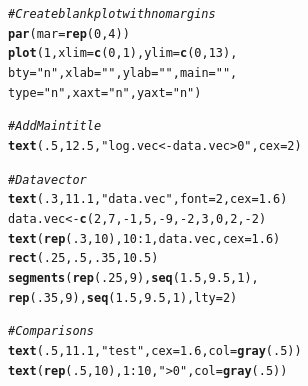 \documentclass{tufte-book}\usepackage[]{graphicx}\usepackage[]{color}
\makeatletter
\newcommand{\hlnum}[1]{\textcolor[rgb]{0.686,0.059,0.569}{#1}}%
\newcommand{\hlstr}[1]{\textcolor[rgb]{0.192,0.494,0.8}{#1}}%
\newcommand{\hlcom}[1]{\textcolor[rgb]{0.678,0.584,0.686}{\textit{#1}}}%
\newcommand{\hlopt}[1]{\textcolor[rgb]{0,0,0}{#1}}%
\newcommand{\hlstd}[1]{\textcolor[rgb]{0.345,0.345,0.345}{#1}}%
\newcommand{\hlkwb}[1]{\textcolor[rgb]{0.69,0.353,0.396}{#1}}%
\newcommand{\hlkwc}[1]{\textcolor[rgb]{0.333,0.667,0.333}{#1}}%
\newcommand{\hlkwd}[1]{\textcolor[rgb]{0.737,0.353,0.396}{\textbf{#1}}}%
\newenvironment{kframe}{%
 \def\at@end@of@kframe{}%
 \ifinner\ifhmode%
  \def\at@end@of@kframe{\end{minipage}}%
  \begin{minipage}{\columnwidth}%
 \fi\fi%
 \def\FrameCommand##1{\hskip\@totalleftmargin \hskip-\fboxsep
 \colorbox{shadecolor}{##1}\hskip-\fboxsep
     \hskip-\linewidth \hskip-\@totalleftmargin \hskip\columnwidth}%
 \MakeFramed {\advance\hsize-\width
   \@totalleftmargin\z@ \linewidth\hsize
   \@setminipage}}%
 {\par\unskip\endMakeFramed%
 \at@end@of@kframe}
\newenvironment{knitrout}{}{} %
\makeatother
\begin{document}
\begin{marginfigure}
\begin{tiny}
\begin{knitrout}
\color{fgcolor}\begin{kframe}
\begin{alltt}
\hlcom{# Create blank plot with no margins}
\hlkwd{par}\hlstd{(}\hlkwc{mar} \hlstd{=} \hlkwd{rep}\hlstd{(}\hlnum{0}\hlstd{,} \hlnum{4}\hlstd{))}
\hlkwd{plot}\hlstd{(}\hlnum{1}\hlstd{,} \hlkwc{xlim} \hlstd{=} \hlkwd{c}\hlstd{(}\hlnum{0}\hlstd{,} \hlnum{1}\hlstd{),} \hlkwc{ylim} \hlstd{=} \hlkwd{c}\hlstd{(}\hlnum{0}\hlstd{,} \hlnum{13}\hlstd{),}
     \hlkwc{bty} \hlstd{=} \hlstr{"n"}\hlstd{,} \hlkwc{xlab} \hlstd{=} \hlstr{""}\hlstd{,} \hlkwc{ylab} \hlstd{=} \hlstr{""}\hlstd{,} \hlkwc{main} \hlstd{=} \hlstr{""}\hlstd{,}
     \hlkwc{type} \hlstd{=} \hlstr{"n"}\hlstd{,} \hlkwc{xaxt} \hlstd{=} \hlstr{"n"}\hlstd{,} \hlkwc{yaxt} \hlstd{=} \hlstr{"n"}\hlstd{)}

\hlcom{# Add Main title}
\hlkwd{text}\hlstd{(}\hlnum{.5}\hlstd{,} \hlnum{12.5}\hlstd{,} \hlstr{"log.vec <- data.vec > 0"}\hlstd{,} \hlkwc{cex} \hlstd{=} \hlnum{2}\hlstd{)}

\hlcom{# Data vector}
\hlkwd{text}\hlstd{(}\hlnum{.3}\hlstd{,} \hlnum{11.1}\hlstd{,} \hlstr{"data.vec"}\hlstd{,} \hlkwc{font} \hlstd{=} \hlnum{2}\hlstd{,} \hlkwc{cex} \hlstd{=} \hlnum{1.6}\hlstd{)}
\hlstd{data.vec} \hlkwb{<-} \hlkwd{c}\hlstd{(}\hlnum{2}\hlstd{,} \hlnum{7}\hlstd{,} \hlopt{-}\hlnum{1}\hlstd{,} \hlnum{5}\hlstd{,} \hlopt{-}\hlnum{9}\hlstd{,} \hlopt{-}\hlnum{2}\hlstd{,} \hlnum{3}\hlstd{,} \hlnum{0}\hlstd{,} \hlnum{2}\hlstd{,} \hlopt{-}\hlnum{2}\hlstd{)}
\hlkwd{text}\hlstd{(}\hlkwd{rep}\hlstd{(}\hlnum{.3}\hlstd{,} \hlnum{10}\hlstd{),} \hlnum{10}\hlopt{:}\hlnum{1}\hlstd{, data.vec,} \hlkwc{cex} \hlstd{=} \hlnum{1.6}\hlstd{)}
\hlkwd{rect}\hlstd{(}\hlnum{.25}\hlstd{,} \hlnum{.5}\hlstd{,} \hlnum{.35}\hlstd{,} \hlnum{10.5}\hlstd{)}
\hlkwd{segments}\hlstd{(}\hlkwd{rep}\hlstd{(}\hlnum{.25}\hlstd{,} \hlnum{9}\hlstd{),} \hlkwd{seq}\hlstd{(}\hlnum{1.5}\hlstd{,} \hlnum{9.5}\hlstd{,} \hlnum{1}\hlstd{),}
         \hlkwd{rep}\hlstd{(}\hlnum{.35}\hlstd{,} \hlnum{9}\hlstd{),} \hlkwd{seq}\hlstd{(}\hlnum{1.5}\hlstd{,} \hlnum{9.5}\hlstd{,} \hlnum{1}\hlstd{),} \hlkwc{lty} \hlstd{=} \hlnum{2}\hlstd{)}


\hlcom{# Comparisons}
\hlkwd{text}\hlstd{(}\hlnum{.5}\hlstd{,} \hlnum{11.1}\hlstd{,} \hlstr{"test"}\hlstd{,} \hlkwc{cex} \hlstd{=} \hlnum{1.6}\hlstd{,} \hlkwc{col} \hlstd{=} \hlkwd{gray}\hlstd{(}\hlnum{.5}\hlstd{))}
\hlkwd{text}\hlstd{(}\hlkwd{rep}\hlstd{(}\hlnum{.5}\hlstd{,} \hlnum{10}\hlstd{),} \hlnum{1}\hlopt{:}\hlnum{10}\hlstd{,} \hlstr{"> 0"}\hlstd{,} \hlkwc{col} \hlstd{=} \hlkwd{gray}\hlstd{(}\hlnum{.5}\hlstd{))}


\end{alltt}
\end{kframe}
\end{knitrout}
\end{tiny}
\end{marginfigure}
\end{document}
